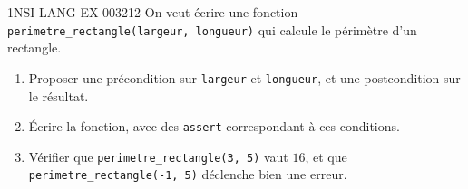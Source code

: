 \begin{exercice}{1NSI-LANG-EX-003}{2}{12}
On veut écrire une fonction \lstinline{perimetre_rectangle(largeur, longueur)} qui calcule
le périmètre d'un rectangle.
\begin{enumerate}
  \item Proposer une précondition sur \lstinline{largeur} et \lstinline{longueur}, et une postcondition sur le résultat.
  \item Écrire la fonction, avec des \lstinline{assert} correspondant à ces conditions.
  \item Vérifier que \lstinline{perimetre_rectangle(3, 5)} vaut $16$, et que \lstinline{perimetre_rectangle(-1, 5)} déclenche bien une erreur.
\end{enumerate}
\end{exercice}
